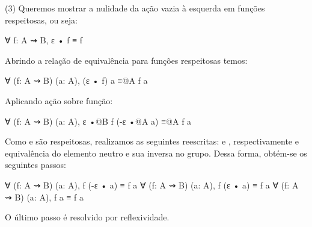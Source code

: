 \begin{description}
	(3) Queremos mostrar a nulidade da ação vazia à esquerda em funções respeitosas, ou seja:
	\begin{coqcode}
∀ f: A ⇝ B, ɛ • f ≡ f
	\end{coqcode}
	Abrindo a relação de equivalência para funções respeitosas temos:
	\begin{coqcode}
∀ (f: A ⇝ B) (a: A), (ɛ • f) a ≡@{A} f a
	\end{coqcode}
	Aplicando ação sobre função:
	\begin{coqcode}
∀ (f: A ⇝ B) (a: A), ɛ •@{B} f (-ɛ •@{A} a) ≡@{A} f a
	\end{coqcode}
	Como  e  são respeitosas, realizamos as seguintes reescritas:  e , respectivamente  e equivalência do elemento neutro e sua inversa no grupo. Dessa forma, obtém-se os seguintes passos:
	\begin{coqcode}
∀ (f: A ⇝ B) (a: A), f (-ɛ • a) ≡ f a
∀ (f: A ⇝ B) (a: A), f (ɛ • a) ≡ f a
∀ (f: A ⇝ B) (a: A), f a ≡ f a
	\end{coqcode}
	O último passo é resolvido por reflexividade.	
\end{description}
